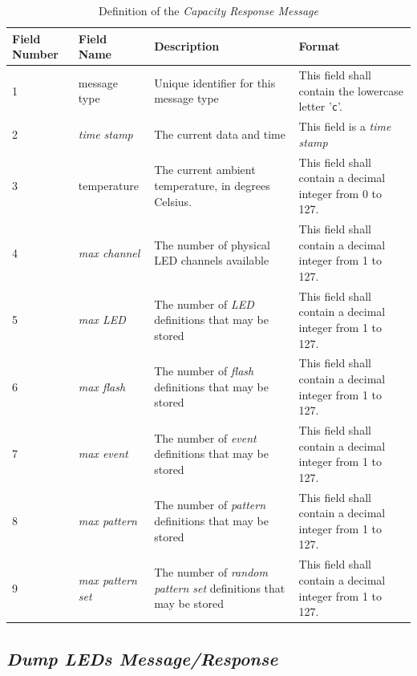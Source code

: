 \documentclass[letterpaper,11pt]{article}
\begin{document}
\begin{table}[H]
  \caption{Definition of the \textit{Capacity Response Message}}
  \centering
  \setlength\extrarowheight{2pt}
  \begin{tabular}[h]{|p{0.5in}|p{1.00in}|p{2.25in}|p{2.25in}|} \hline
    Field Number & Field Name & Description & Format \\ \hline
    1            & message type
    & Unique identifier for this message type
    & This field shall contain the lowercase letter '\texttt{c}'.
    \\ \hline
    2            & \textit{time stamp}
    & The current data and time
    & This field is a \textit{time stamp}
    \\ \hline
    3            & temperature
    & The current ambient temperature, in degrees Celsius.
    & This field shall contain a decimal integer from 0 to 127.
    \\ \hline
    4            & \textit{max channel}
    & The number of physical LED channels available
    & This field shall contain a decimal integer from 1 to 127.
    \\ \hline
    5            & \textit{max LED}
    & The number of \textit{LED} definitions that may be stored
    & This field shall contain a decimal integer from 1 to 127.
    \\ \hline
    6            & \textit{max flash}
    & The number of \textit{flash} definitions that may be stored
    & This field shall contain a decimal integer from 1 to 127.
    \\ \hline
    7            & \textit{max event}
    & The number of \textit{event} definitions that may be stored
    & This field shall contain a decimal integer from 1 to 127.
    \\ \hline
    8            & \textit{max pattern}
    & The number of \textit{pattern} definitions that may be stored
    & This field shall contain a decimal integer from 1 to 127.
    \\ \hline
    9            & \textit{max pattern set}
    & The number of \textit{random pattern set} definitions that may be stored
    & This field shall contain a decimal integer from 1 to 127.
    \\ \hline
  \end{tabular}
  \label{tab:CapacityResponse}
\end{table}

\subsection{\textit{Dump LEDs Message/Response}}
\end{document}
